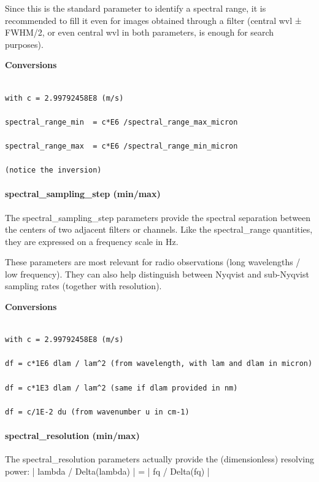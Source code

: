 \documentclass[11pt,a4paper]{ivoa}
\begin{document}
Since this is the standard parameter to identify a spectral range, it is recommended to fill it even for images obtained through a filter (central wvl ± FWHM/2, or even central wvl in both parameters, is enough for search purposes). 

\textbf{Conversions}

\begin{verbatim}

with c = 2.99792458E8 (m/s)

spectral_range_min  = c*E6 /spectral_range_max_micron

spectral_range_max  = c*E6 /spectral_range_min_micron

(notice the inversion)

\end{verbatim}

\paragraph{spectral\_sampling\_step (min/max)}

The spectral\_sampling\_step parameters provide the spectral separation between the centers of two adjacent filters or channels. Like the spectral\_range quantities, they are expressed on a frequency scale in Hz. 

These parameters are most relevant for radio observations (long wavelengths / low frequency). They can also help distinguish between Nyqvist and sub-Nyqvist sampling rates (together with resolution).

\textbf{Conversions}

\begin{verbatim}

with c = 2.99792458E8 (m/s)

df = c*1E6 dlam / lam^2 (from wavelength, with lam and dlam in micron)

df = c*1E3 dlam / lam^2 (same if dlam provided in nm)

df = c/1E-2 du (from wavenumber u in cm-1)

\end{verbatim}

\paragraph{spectral\_resolution (min/max)}

The spectral\_resolution parameters actually provide the (dimensionless) resolving power: | lambda / Delta(lambda) | = | fq / Delta(fq) |  
\end{document}
